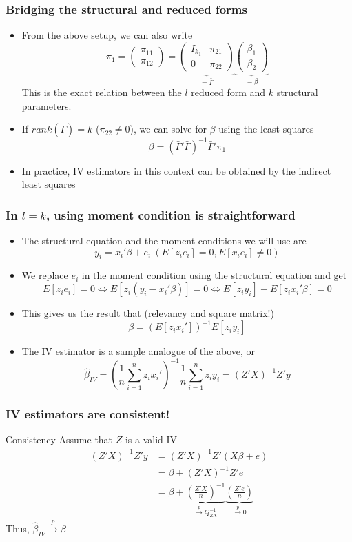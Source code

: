 \documentclass[aspectratio=169]{beamer}
\begin{document}
\begin{frame}
\frametitle{Bridging the structural and reduced forms}
\begin{itemize} 
\item From the above setup, we can also write
\[
\pi_1 = \begin{pmatrix}\pi_{11} \\ \pi_{12}\end{pmatrix} =\underbrace{\begin{pmatrix} I_{k_1} & \pi_{21}\\ 0 & \pi_{22} \end{pmatrix}}_{=\bar{\Gamma}}\underbrace{\begin{pmatrix}\beta_{1} \\ \beta_{2}\end{pmatrix}}_{=\beta}
\]
This is the exact relation between the $l$ reduced form and $k$ structural parameters. 
\item If $rank(\bar{\Gamma})=k$ ($\pi_{22}\neq0$), we can solve for $\beta$ using the least squares
\[
\beta= (\bar{\Gamma}'\bar{\Gamma})^{-1}\bar{\Gamma}'\pi_1 
\]
\item In practice, IV estimators in this context can be obtained by the indirect least squares
\end{itemize}
\end{frame}

\begin{frame}
\frametitle{In $l=k$, using moment condition is straightforward}
\begin{itemize} 
\item The structural equation and the moment conditions we will use are
\[
y_i = x_i'\beta+e_i \ (E[z_ie_i]=0, E[x_ie_i]\neq0)
\]
\item We replace $e_i$ in the moment condition using the structural equation and get
\[
E[z_ie_i]=0 \iff E[z_i(y_i-x_i'\beta)]=0 \iff E[z_iy_i]-E[z_ix_i'\beta]=0
\]
\item This gives us the result that (relevancy and square matrix!)
\[
\beta=\left(E[z_ix_i']\right)^{-1}E[z_iy_i]
\]
\item The IV estimator is a sample analogue of the above, or
\footnotesize{\[
\hat{\beta}_{IV}=\left(\frac{1}{n}\sum_{i=1}^nz_ix_i'\right)^{-1}\frac{1}{n}\sum_{i=1}^nz_iy_i = (Z'X)^{-1}Z'y
\] }\normalsize
\end{itemize}
\end{frame}

\begin{frame}
\frametitle{IV estimators are consistent!}
\begin{block}{Consistency}
Assume that $Z$ is a valid IV
\[
\begin{aligned}
(Z'X)^{-1}Z'y&=(Z'X)^{-1}Z'(X\beta+e)\\
&=\beta+(Z'X)^{-1}Z'e\\
&=\beta+\underbrace{\left(\frac{Z'X}{n}\right)^{-1}}_{\xrightarrow{p}Q_{ZX}^{-1}}\underbrace{\left(\frac{Z'e}{n}\right)}_{\xrightarrow{p}0}
\end{aligned}
\]
Thus, $\hat{\beta}_{IV}\xrightarrow{p}\beta$
\end{block}
\end{frame}
\end{document}
